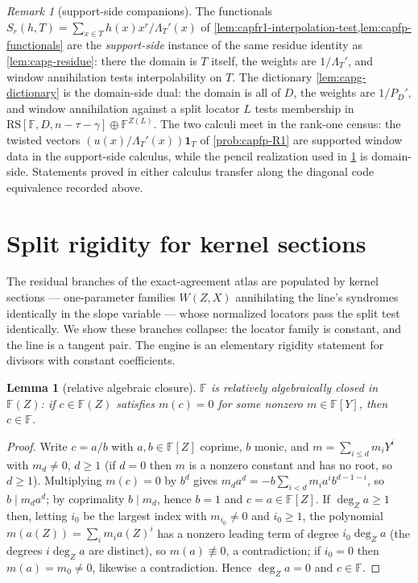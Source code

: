\documentclass[11pt]{article}
\newtheorem{lemma}[lemma]{Lemma}
\theoremstyle{definition}
\theoremstyle{remark}
\newtheorem{remark}[remark]{Remark}
\newcommand{\F}{\mathbb{F}}
\newcommand{\RS}{\mathrm{RS}}
\begin{document}
\begin{remark}[support-side companions]\label{rem:capg-supportside}
The functionals $S_r(h,T)=\sum_{x\in T}h(x)x^r/\Lambda_T'(x)$ of
\cref{lem:capfr1-interpolation-test,lem:capfp-functionals} are the
\emph{support-side} instance of the same residue identity as
\cref{lem:capg-residue}: there the domain is $T$ itself, the weights are
$1/\Lambda_T'$, and window annihilation tests interpolability on $T$.
The dictionary \cref{lem:capg-dictionary} is the domain-side dual: the
domain is all of $D$, the weights are $1/P_D'$, and window annihilation
against a split locator $L$ tests membership in
$\RS[\F,D,n-\tau-\gamma]\oplus\F^{Z(L)}$.  The two calculi meet in the
rank-one census: the twisted vectors
$(u(x)/\Lambda_T'(x))\mathbf 1_T$ of \cref{prob:capfp-R1} are supported
window data in the support-side calculus, while the pencil realization
used in \cref{sec:capg-rigidity} is domain-side.  Statements proved in
either calculus transfer along the diagonal code equivalence recorded
above.
\end{remark}

\section{Split rigidity for kernel sections}\label{sec:capg-rigidity}

The residual branches of the exact-agreement atlas are populated by kernel
sections --- one-parameter families $W(Z,X)$ annihilating the line's
syndromes identically in the slope variable --- whose normalized locators
pass the split test identically.  We show these branches collapse: the
locator family is constant, and the line is a tangent pair.  The engine is
an elementary rigidity statement for divisors with constant coefficients.

\begin{lemma}[relative algebraic closure]\label{lem:capg-relclosed}
$\F$ is relatively algebraically closed in $\F(Z)$: if $c\in\F(Z)$ satisfies
$m(c)=0$ for some nonzero $m\in\F[Y]$, then $c\in\F$.
\end{lemma}

\begin{proof}
Write $c=a/b$ with $a,b\in\F[Z]$ coprime, $b$ monic, and
$m=\sum_{i\leq d}m_iY^i$ with $m_d\neq 0$, $d\geq 1$ (if $d=0$ then $m$ is a
nonzero constant and has no root, so $d\geq 1$).  Multiplying $m(c)=0$ by
$b^d$ gives $m_d a^d=-b\sum_{i<d}m_ia^ib^{d-1-i}$, so $b\mid m_d a^d$; by
coprimality $b\mid m_d$, hence $b=1$ and $c=a\in\F[Z]$.  If $\deg_Z a\geq 1$
then, letting $i_0$ be the largest index with $m_{i_0}\neq 0$ and
$i_0\geq 1$, the polynomial $m(a(Z))=\sum_i m_ia(Z)^i$ has a nonzero leading
term of degree $i_0\deg_Z a$ (the degrees $i\deg_Z a$ are distinct), so
$m(a)\not\equiv 0$, a contradiction; if $i_0=0$ then $m(a)=m_0\ne0$,
likewise a contradiction.  Hence $\deg_Z a=0$ and $c\in\F$.
\end{proof}
\end{document}
